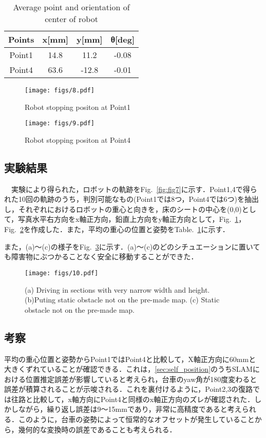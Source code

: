 \begin{table}[!t]
    \caption{Average point and orientation of center of robot}
    \label{table2}
    \centering
    \begin{tabular}{cccc} \hline
      Points & x[mm] & y[mm] & θ[deg]\\
     \hline \hline
      Point1 & 14.8 & 11.2 & -0.08\\
      Point4 & 63.6 & -12.8 & -0.01\\
      \hline
    \end{tabular}
\end{table}

\begin{figure}[!t]
\texttt{[image: figs/8.pdf]}
\caption{Robot stopping positon at Point1}
\label{fig:fig8}
\end{figure}

\begin{figure}[!t]
\texttt{[image: figs/9.pdf]}
\caption{Robot stopping positon at Point4}
\label{fig:fig9}
\end{figure}

\subsection{実験結果}
　実験により得られた，ロボットの軌跡をFig.~\ref{fig:fig7}に示す．Point1,4で得られた10回の軌跡のうち，判別可能なもの(Point1では8つ，Point4では6つ)を抽出し，それぞれにおけるロボットの重心と向きを，床のシートの中心を(0,0)として，写真水平右方向をx軸正方向，鉛直上方向をy軸正方向として，Fig.~\ref{fig:fig8}，Fig.~\ref{fig:fig9}を作成した．また，平均の重心の位置と姿勢をTable.~\ref{table2}に示す．

また，(a)〜(c)の様子をFig.~\ref{fig:fig10}に示す．(a)〜(c)のどのシチュエーションに置いても障害物にぶつかることなく安全に移動することができた．

\begin{figure}[!t]
\texttt{[image: figs/10.pdf]}
\caption{(a) Driving in sections with very narrow width and height. (b)Puting static obstacle not on the pre-made map. (c) Static obstacle not on the pre-made map.}
\label{fig:fig10}
\end{figure}

\subsection{考察}
平均の重心位置と姿勢からPoint1ではPoint4と比較して，X軸正方向に60mmと大きくずれていることが確認できる．これは，\ref{sec:self_position}のうちSLAMにおける位置推定誤差が影響していると考えられ，台車のyaw角が180度変わると誤差が積算されることが示唆される．これを裏付けるように，Point2,3の復路では往路と比較して，x軸方向にPoint4と同様のx軸正方向のズレが確認された．しかしながら，繰り返し誤差は9〜15mmであり，非常に高精度であると考えられる．このように，台車の姿勢によって恒常的なオフセットが発生していることから，幾何的な変換時の誤差であることも考えられる．

